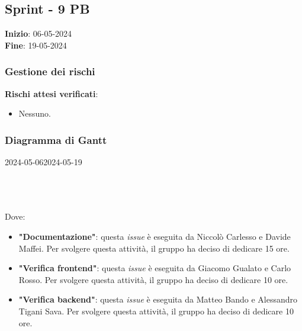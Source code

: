 \subsection{Sprint - 9 PB}
\textbf{Inizio}: 06-05-2024 \\
\textbf{Fine}: 19-05-2024 \\

\subsubsection{Gestione dei rischi}
\textbf{Rischi attesi verificati}:

\begin{itemize}
	\item Nessuno.
\end{itemize}

\subsubsection{Diagramma di Gantt}

\begin{ganttchart}[
		x unit=0.6cm, %
		y unit chart=0.6cm,
		bar/.style={fill=blue!50},
		bar height=0.5,
		time slot format=isodate,
		time slot unit=day,
		vgrid,
		today=2024-05-06,
		today rule/.style={draw=red, ultra thick}
	]{2024-05-06}{2024-05-19}
	 \\
	 \\
	 \\
	 \\
\end{ganttchart}

Dove:
\begin{itemize}
	\item \textbf{"Documentazione"}: questa \textit{issue} è eseguita da Niccolò Carlesso e Davide Maffei. Per svolgere questa attività, il gruppo ha deciso di dedicare 15 ore.
	\item \textbf{"Verifica frontend"}: questa \textit{issue} è eseguita da Giacomo Gualato e Carlo Rosso. Per svolgere questa attività, il gruppo ha deciso di dedicare 10 ore.
	\item \textbf{"Verifica backend"}: questa \textit{issue} è eseguita da Matteo Bando e Alessandro Tigani Sava. Per svolgere questa attività, il gruppo ha deciso di dedicare 10 ore.
\end{itemize}

